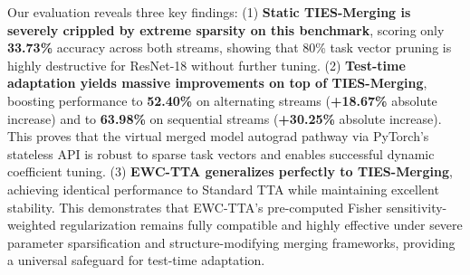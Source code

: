 \documentclass{article}
\theoremstyle{plain}
\theoremstyle{definition}
\theoremstyle{remark}
\begin{document}
\begin{table}[h]
\caption{Generalization of test-time model merging to TIES-processed task vectors (using a sparse fraction of $0.20$, $\eta_\lambda=0.50$, $\gamma=100.0$). Static TIES-Merging baseline suffers from extreme sparsity on this scale, scoring only \textbf{33.73\%} accuracy. Implementing test-time adaptation on top of TIES task vectors provides huge performance improvements across both streams.}
\label{ties-table}
\vskip 0.05in
\begin{center}
\begin{small}
\begin{sc}
\end{sc}
\end{small}
\end{center}
\vskip -0.15in
\end{table}

Our evaluation reveals three key findings:
(1) \textbf{Static TIES-Merging is severely crippled by extreme sparsity on this benchmark}, scoring only \textbf{33.73\%} accuracy across both streams, showing that 80\% task vector pruning is highly destructive for ResNet-18 without further tuning.
(2) \textbf{Test-time adaptation yields massive improvements on top of TIES-Merging}, boosting performance to \textbf{52.40\%} on alternating streams (\textbf{+18.67\%} absolute increase) and to \textbf{63.98\%} on sequential streams (\textbf{+30.25\%} absolute increase). This proves that the virtual merged model autograd pathway via PyTorch's stateless API is robust to sparse task vectors and enables successful dynamic coefficient tuning.
(3) \textbf{EWC-TTA generalizes perfectly to TIES-Merging}, achieving identical performance to Standard TTA while maintaining excellent stability. This demonstrates that EWC-TTA's pre-computed Fisher sensitivity-weighted regularization remains fully compatible and highly effective under severe parameter sparsification and structure-modifying merging frameworks, providing a universal safeguard for test-time adaptation.
\end{document}
